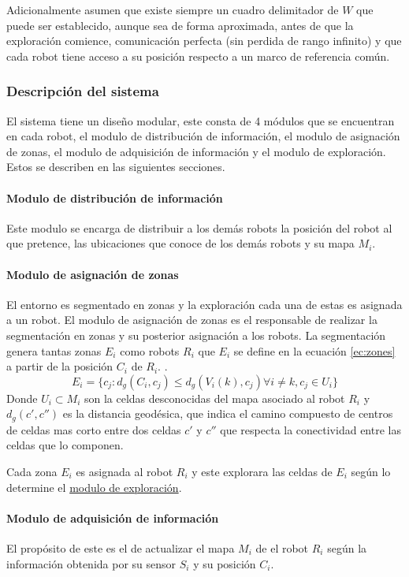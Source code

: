 Adicionalmente asumen que existe siempre un cuadro delimitador de $W$ que puede ser establecido, aunque sea de forma aproximada, antes de que la exploración comience, comunicación perfecta (sin perdida de rango infinito) y que cada robot tiene acceso a su posición respecto a un marco de referencia común.

\subsubsection{Descripción del sistema}
El sistema tiene un diseño modular, este consta de 4 módulos que se encuentran en cada robot, el modulo de distribución de información, el modulo de asignación de zonas, el modulo de adquisición de información y el modulo de exploración. Estos se describen en las siguientes secciones. 

\paragraph{Modulo de distribución de información}
Este modulo se encarga de distribuir a los demás robots la posición del robot al que pretence, las ubicaciones que conoce de los demás robots y su mapa $M_i$. 

\paragraph{Modulo de asignación de zonas }
El entorno es segmentado en zonas y la exploración cada una de estas es asignada a un robot. El modulo de asignación de zonas es el responsable de realizar la segmentación en zonas y su posterior asignación a los robots. La segmentación genera tantas zonas $E_i$ como robots $R_i$ que $E_i$ se define en la ecuación \ref{ec:zones} a partir de la posición $C_i$ de $R_i$. .
\begin{equation}\label{ec:zones}
  E_i=\{c_j:d_g(C_i,c_j)\leq d_g(V_i(k),c_j) \forall i \neq k , c_j \in U_i\}
\end{equation}
Donde $U_i \subset M_i$ son la celdas desconocidas del mapa asociado al robot $R_i$ y $d_g(c',c'')$ es la distancia geodésica, que indica el camino compuesto de centros de celdas mas corto entre dos celdas $c'$ y $c''$ que respecta la conectividad entre las celdas que lo componen.

Cada zona $E_i$ es asignada al robot $R_i$ y este explorara las celdas de $E_i$ según lo determine el \hyperref[par:estar:moduloexp]{modulo de exploración}.

\paragraph{Modulo de adquisición de información}
El propósito de este es el de actualizar el mapa $M_i$ de el robot $R_i$ según la información obtenida por su sensor $S_i$ y su posición $C_i$.

